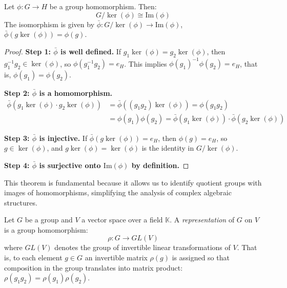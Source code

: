 \begin{theorem}\label{thm:primer_isomorfismo}
Let $\phi: G \rightarrow H$ be a group homomorphism. Then:
\begin{equation}
G/\ker(\phi) \cong \mathrm{Im}(\phi)
\end{equation}
The isomorphism is given by $\bar{\phi}: G/\ker(\phi) \rightarrow \mathrm{Im}(\phi)$, $\bar{\phi}(g\ker(\phi)) = \phi(g)$.
\end{theorem}

\begin{proof}
\textbf{Step 1: $\bar{\phi}$ is well defined.} If $g_1\ker(\phi) = g_2\ker(\phi)$, then $g_1^{-1}g_2 \in \ker(\phi)$, so $\phi(g_1^{-1}g_2) = e_H$. This implies $\phi(g_1)^{-1}\phi(g_2) = e_H$, that is, $\phi(g_1) = \phi(g_2)$.

\textbf{Step 2: $\bar{\phi}$ is a homomorphism.}
\begin{align*}
\bar{\phi}(g_1\ker(\phi) \cdot g_2\ker(\phi)) &= \bar{\phi}((g_1g_2)\ker(\phi)) = \phi(g_1g_2) \\
&= \phi(g_1)\phi(g_2) = \bar{\phi}(g_1\ker(\phi)) \cdot \bar{\phi}(g_2\ker(\phi))
\end{align*}

\textbf{Step 3: $\bar{\phi}$ is injective.} If $\bar{\phi}(g\ker(\phi)) = e_H$, then $\phi(g) = e_H$, so $g \in \ker(\phi)$, and $g\ker(\phi) = \ker(\phi)$ is the identity in $G/\ker(\phi)$.

\textbf{Step 4: $\bar{\phi}$ is surjective onto $\mathrm{Im}(\phi)$ by definition.}
\end{proof}

This theorem is fundamental because it allows us to identify quotient groups with images of homomorphisms, simplifying the analysis of complex algebraic structures.

\begin{definition}\label{def:representacion_grupo}
Let $G$ be a group and $V$ a vector space over a field $\mathbb{K}$. A \textit{representation} of $G$ on $V$ is a group homomorphism:
\begin{equation}
\rho: G \rightarrow GL(V)
\end{equation}
where $GL(V)$ denotes the group of invertible linear transformations of $V$. That is, to each element $g \in G$ an invertible matrix $\rho(g)$ is assigned so that composition in the group translates into matrix product: $\rho(g_1 g_2) = \rho(g_1)\rho(g_2)$.
\end{definition}

